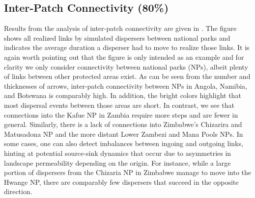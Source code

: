 \documentclass[abstract=on,10pt,a4paper,bibliography=totocnumbered]{article}
\begin{document}
\subsection{Inter-Patch Connectivity (80\%)}
Results from the analysis of inter-patch connectivity are given in
. The figure shows all realized links by simulated dispersers
between national parks and indicates the average duration a disperser had to
move to realize those links. It is again worth pointing out that the figure is
only intended as an example and for clarity we only consider connectivity
between national parks (NPs), albeit plenty of links between other protected
areas exist. As can be seen from the number and thicknesses of arrows,
inter-patch connectivity between NPs in Angola, Namibia, and Botswana is
comparably high. In addition, the bright colors highlight that most dispersal
events between those areas are short. In contrast, we see that connections into
the Kafue NP in Zambia require more steps and are fewer in general. Similarly,
there is a lack of connections into Zimbabwe's Chizarira and Matusadona NP and
the more distant Lower Zambezi and Mana Pools NPs. In some cases, one can also
detect imbalances between ingoing and outgoing links, hinting at potential
source-sink dynamics that occur due to asymmetries in landscape permeability
depending on the origin. For instance, while a large portion of dispersers from
the Chizaria NP in Zimbabwe manage to move into the Hwange NP, there are
comparably few dispersers that succeed in the opposite direction.

\end{document}
